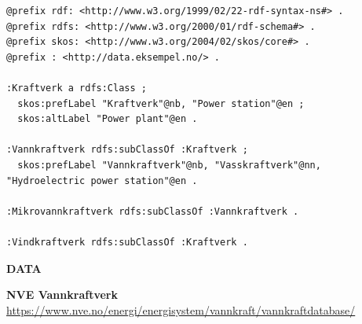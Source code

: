 \documentclass{dt}
\begin{document}
\begin{frame}[fragile]{}
\begin{code}
\begin{verbatim}
@prefix rdf: <http://www.w3.org/1999/02/22-rdf-syntax-ns#> .
@prefix rdfs: <http://www.w3.org/2000/01/rdf-schema#> .
@prefix skos: <http://www.w3.org/2004/02/skos/core#> .
@prefix : <http://data.eksempel.no/> .

:Kraftverk a rdfs:Class ;
  skos:prefLabel "Kraftverk"@nb, "Power station"@en ;
  skos:altLabel "Power plant"@en .

:Vannkraftverk rdfs:subClassOf :Kraftverk ;
  skos:prefLabel "Vannkraftverk"@nb, "Vasskraftverk"@nn, "Hydroelectric power station"@en .

:Mikrovannkraftverk rdfs:subClassOf :Vannkraftverk .

:Vindkraftverk rdfs:subClassOf :Kraftverk .
\end{verbatim}
\end{code}
\end{frame}




\begin{frame}
\Huge{\textbf{DATA}}
\end{frame}

\begin{frame}{}
\begin{center}
\end{center}
\vspace{5pt}
\small{\textbf{NVE Vannkraftverk} \url{https://www.nve.no/energi/energisystem/vannkraft/vannkraftdatabase/}}
\end{frame}
\end{document}
